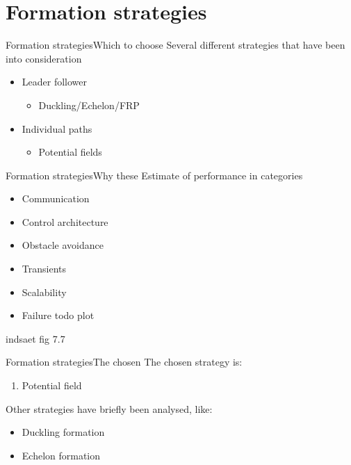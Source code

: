 \documentclass[10pt,handout]{beamer}
\begin{document}
\section{Formation strategies}

\begin{frame}{Formation strategies}{Which to choose}
Several different strategies that have been into consideration
  \begin{itemize}
    \item Leader follower
    \begin{itemize}
      \item Duckling/Echelon/FRP
    \end{itemize}
    \item Individual paths
    \begin{itemize}
      \item Potential fields
    \end{itemize}
   \end{itemize}
\end{frame}

\begin{frame}{Formation strategies}{Why these}
Estimate of performance in categories
\begin{itemize}
  \item Communication
  \item Control architecture
  \item Obstacle avoidance
  \item Transients
  \item Scalability
  \item Failure todo plot
\end{itemize}
indsaet fig 7.7
\end{frame}

\begin{frame}{Formation strategies}{The chosen}
The chosen strategy is:
\begin{enumerate}
  \item Potential field
\end{enumerate}
Other strategies have briefly been analysed, like:
\begin{itemize}
\item Duckling formation
\item Echelon formation
\end{itemize}
\end{frame}
\end{document}
